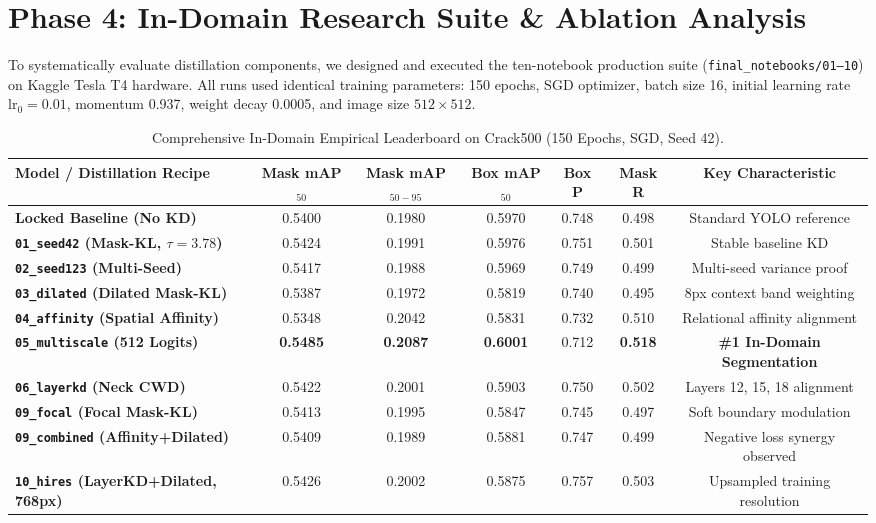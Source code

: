 \documentclass[11pt,a4paper]{article}
\begin{document}
\section{Phase 4: In-Domain Research Suite \& Ablation Analysis}
\label{sec:phase4}

To systematically evaluate distillation components, we designed and executed the ten-notebook production suite (\texttt{final\_notebooks/01--10}) on Kaggle Tesla T4 hardware. 
All runs used identical training parameters: 150 epochs, SGD optimizer, batch size 16, initial learning rate $\text{lr}_0=0.01$, momentum 0.937, weight decay 0.0005, and image size $512\times512$.

\begin{table}[H]
\centering
\small
\caption{Comprehensive In-Domain Empirical Leaderboard on Crack500 (150 Epochs, SGD, Seed 42).}
\label{tab:indomain_leaderboard}
\begin{tabular}{lcccccc}
\toprule
\textbf{Model / Distillation Recipe} & \textbf{Mask mAP$_{50}$} & \textbf{Mask mAP$_{50-95}$} & \textbf{Box mAP$_{50}$} & \textbf{Box P} & \textbf{Mask R} & \textbf{Key Characteristic} \\
\midrule
\textbf{Locked Baseline (No KD)} & 0.5400 & 0.1980 & 0.5970 & 0.748 & 0.498 & Standard YOLO reference \\
\textbf{\texttt{01\_seed42} (Mask-KL, $\tau=3.78$)} & 0.5424 & 0.1991 & 0.5976 & 0.751 & 0.501 & Stable baseline KD \\
\textbf{\texttt{02\_seed123} (Multi-Seed)} & 0.5417 & 0.1988 & 0.5969 & 0.749 & 0.499 & Multi-seed variance proof \\
\textbf{\texttt{03\_dilated} (Dilated Mask-KL)} & 0.5387 & 0.1972 & 0.5819 & 0.740 & 0.495 & 8px context band weighting \\
\textbf{\texttt{04\_affinity} (Spatial Affinity)} & 0.5348 & 0.2042 & 0.5831 & 0.732 & 0.510 & Relational affinity alignment \\
\textbf{\texttt{05\_multiscale} (512 Logits)} & \textbf{0.5485} & \textbf{0.2087} & \textbf{0.6001} & 0.712 & \textbf{0.518} & \textbf{\#1 In-Domain Segmentation} \\
\textbf{\texttt{06\_layerkd} (Neck CWD)} & 0.5422 & 0.2001 & 0.5903 & 0.750 & 0.502 & Layers 12, 15, 18 alignment \\
\textbf{\texttt{09\_focal} (Focal Mask-KL)} & 0.5413 & 0.1995 & 0.5847 & 0.745 & 0.497 & Soft boundary modulation \\
\textbf{\texttt{09\_combined} (Affinity+Dilated)} & 0.5409 & 0.1989 & 0.5881 & 0.747 & 0.499 & Negative loss synergy observed \\
\textbf{\texttt{10\_hires} (LayerKD+Dilated, 768px)} & 0.5426 & 0.2002 & 0.5875 & 0.757 & 0.503 & Upsampled training resolution \\
\bottomrule
\end{tabular}
\end{table}
\end{document}
